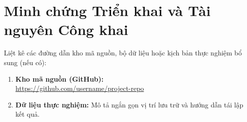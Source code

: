 
\chapter{Minh chứng Triển khai và Tài nguyên Công khai}\label{app:minh_chung}

Liệt kê các đường dẫn kho mã nguồn, bộ dữ liệu hoặc kịch bản thực nghiệm bổ sung (nếu có):

\begin{enumerate}[leftmargin=*]
  \item \textbf{Kho mã nguồn (GitHub):}\\
  \url{https://github.com/username/project-repo}
  \item \textbf{Dữ liệu thực nghiệm:} Mô tả ngắn gọn vị trí lưu trữ và hướng dẫn tái lập kết quả.
\end{enumerate}
